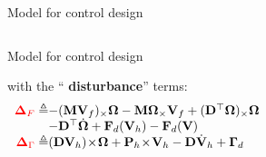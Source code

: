 \documentclass{beamer}
\begin{document}
\begin{frame}{Model for control design}
\begin{columns}
\begin{block}{Model for control design}
		
		\noindent with the ``\textbf{\color{red} disturbance}'' terms: 
		\[
		\begin{array}{rl}
		{\color{red}\mathbf{\Delta}_F} \triangleq\!\!\!\!\!\!& -(\mathbf{M}\mathbf{V}_f)_\times \mathbf{\Omega} -\mathbf{M} \mathbf{\Omega}_\times \mathbf{V}_f + (\mathbf{D}^\top \mathbf{\Omega})_\times \mathbf{\Omega}\\
		&-\mathbf{D}^\top \dot{\mathbf{\Omega}}
		+ \mathbf{F}_d(\mathbf{V}_h) - \mathbf{F}_d(\mathbf{V}) \\
		{\color{red}\mathbf{\Delta}_{\Gamma}} \triangleq\!\!\!\!\!\! &(\mathbf{DV}_h)\!\times \!\mathbf{\Omega} + \mathbf{P}_h \!\times \!\mathbf{V}_h  - \mathbf{D}\dot{\mathbf{V}}_h  + \mathbf{\Gamma}_d\vspace{-0.1cm}
		\end{array} %
		\]
	\end{block}
\end{columns}
	
\end{frame}
\end{document}
